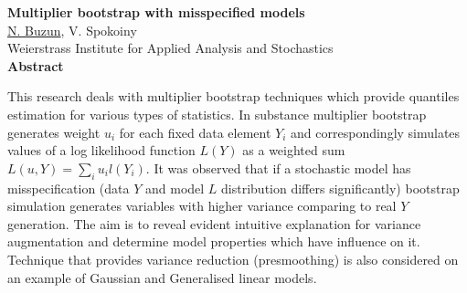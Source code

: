 \documentclass[a4paper,12pt]{report}
\begin{document}
\begin{samepage}

\begin{center}
\textbf{Multiplier  bootstrap with misspecified models }\\
\underline{N. Buzun}, V. Spokoiny \\
 Weierstrass Institute for Applied Analysis and Stochastics \\ $ $ \\
 
 \textbf{Abstract}
\end{center}

\nopagebreak



This research  deals with multiplier bootstrap techniques which provide quantiles estimation for various types of statistics. 
In substance multiplier bootstrap generates weight $u_i$ for each fixed data element $Y_i$ and correspondingly simulates values of a log likelihood function $L(Y)$ as a weighted sum $L(u,Y) = \sum_i u_i l(Y_i)$.  
It was observed that if a stochastic model has misspecification (data $Y$ and model $L$ distribution differs significantly) bootstrap simulation generates variables with higher variance comparing to  real $Y$ generation. The aim is	 to reveal evident intuitive explanation for variance augmentation and determine model properties which have influence on it. Technique that provides variance reduction (presmoothing) is also considered on an example of Gaussian and Generalised linear models.             

\end{samepage}
\end{document}
